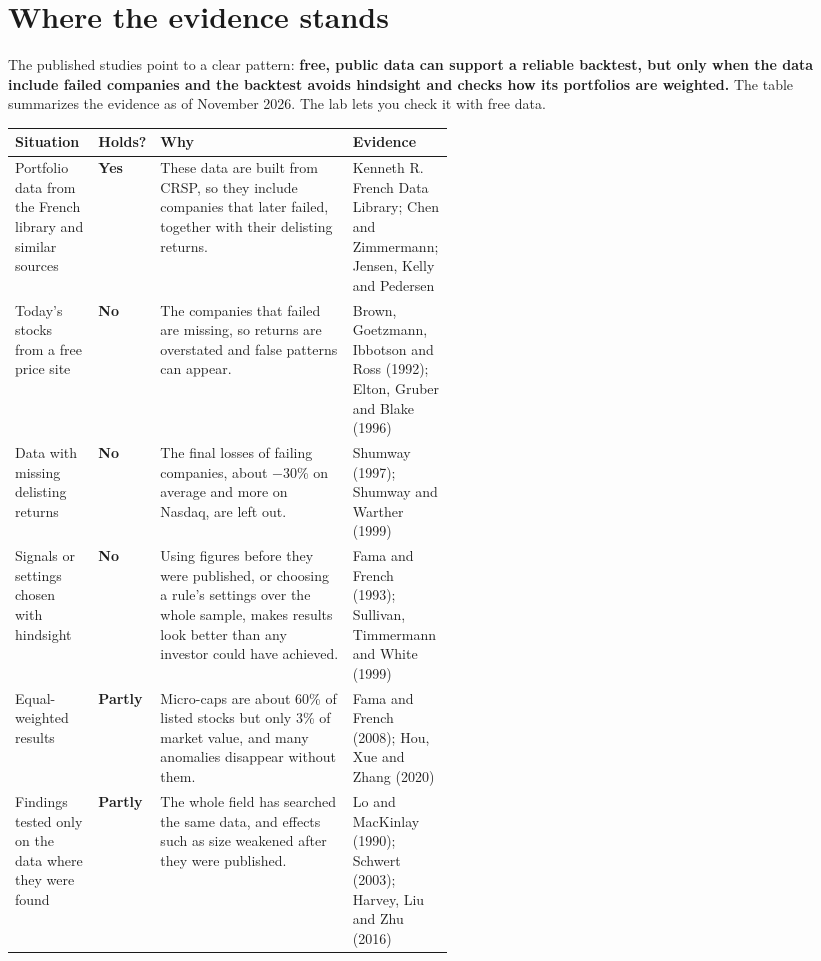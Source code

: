 \section{Where the evidence stands}
\label{sec:02-verdict}

The published studies point to a clear pattern: \textbf{free, public data can support a reliable backtest, but only when the data include failed companies and the backtest avoids hindsight and checks how its portfolios are weighted.} The table summarizes the evidence as of November 2026. The lab lets you check it with free data.

\begin{center}
\small
\begin{tabularx}{\linewidth}{@{}>{\raggedright\arraybackslash}p{0.19\linewidth}>{\raggedright\arraybackslash}p{0.09\linewidth}>{\raggedright\arraybackslash}X>{\raggedright\arraybackslash}p{0.23\linewidth}@{}}
\toprule
Situation & Holds? & Why & Evidence \\
\midrule
Portfolio data from the French library and similar sources & \textbf{Yes} & These data are built from CRSP, so they include companies that later failed, together with their delisting returns. & Kenneth R. French Data Library; Chen and Zimmermann; Jensen, Kelly and Pedersen \\
\addlinespace[3pt]
Today's stocks from a free price site & \textbf{No} & The companies that failed are missing, so returns are overstated and false patterns can appear. & Brown, Goetzmann, Ibbotson and Ross (1992); Elton, Gruber and Blake (1996) \\
\addlinespace[3pt]
Data with missing delisting returns & \textbf{No} & The final losses of failing companies, about $-30$\% on average and more on Nasdaq, are left out. & Shumway (1997); Shumway and Warther (1999) \\
\addlinespace[3pt]
Signals or settings chosen with hindsight & \textbf{No} & Using figures before they were published, or choosing a rule's settings over the whole sample, makes results look better than any investor could have achieved. & Fama and French (1993); Sullivan, Timmermann and White (1999) \\
\addlinespace[3pt]
Equal-weighted results & \textbf{Partly} & Micro-caps are about 60\% of listed stocks but only 3\% of market value, and many anomalies disappear without them. & Fama and French (2008); Hou, Xue and Zhang (2020) \\
\addlinespace[3pt]
Findings tested only on the data where they were found & \textbf{Partly} & The whole field has searched the same data, and effects such as size weakened after they were published. & Lo and MacKinlay (1990); Schwert (2003); Harvey, Liu and Zhu (2016) \\
\bottomrule
\end{tabularx}
\end{center}

